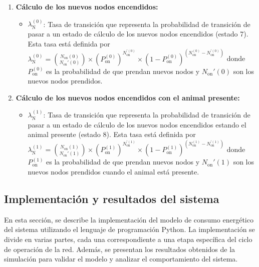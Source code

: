 \begin{enumerate}[label=\arabic*.]
    \item \textbf{Cálculo de los nuevos nodos encendidos:}
    \begin{itemize}
        \item $\lambda_{\text{N}}^{(0)}$: Tasa de transición que representa la probabilidad de transición de pasar a un estado de cálculo de los nuevos nodos encendidos (estado 7). Esta tasa está definida por 
        $\lambda_{\text{N}}^{(0)} = \binom{N_{\text{on}}(0)}{N_{\text{on}}'(0)} \times (P_{\text{on}}^{(0)})^{N_{\text{on}}^{'(0)}} \times (1 - P_{\text{on}}^{(0)})^{(N_{\text{on}}^{(0)} - N_{\text{on}}^{'(0)})}$ donde $P_{\text{on}}^{(0)}$ es la probabilidad de que prendan nuevos nodos y $N_{\text{on}}'(0)$ son los nuevos nodos prendidos.
    \end{itemize}
    
    \item \textbf{Cálculo de los nuevos nodos encendidos con el animal presente:}
    \begin{itemize}
        \item $\lambda_{\text{N}}^{(1)}$: Tasa de transición que representa la probabilidad de transición de pasar a un estado de cálculo de los nuevos nodos encendidos estando el animal presente (estado 8). Esta tasa está definida por $\lambda_{\text{N}}^{(1)} = \binom{N_{\text{on}}(1)}{N_{\text{on}}'(1)} \times (P_{\text{on}}^{(1)})^{N_{\text{on}}^{'(1)}} \times (1 - P_{\text{on}}^{(1)})^{(N_{\text{on}}^{(1)} - N_{\text{on}}^{'(1)})}$ donde $P_{\text{on}}^{(1)}$ es la probabilidad de que prendan nuevos nodos y $N_{\text{on}}'(1)$ son los nuevos nodos prendidos cuando el animal está presente.
    \end{itemize}
\end{enumerate}

\subsection{Implementación y resultados del sistema}
En esta sección, se describe la implementación del modelo de consumo energético del sistema utilizando el lenguaje de programación Python. La implementación se divide en varias partes, cada una correspondiente a una etapa específica del ciclo de operación de la red. Además, se presentan los resultados obtenidos de la simulación para validar el modelo y analizar el comportamiento del sistema.

